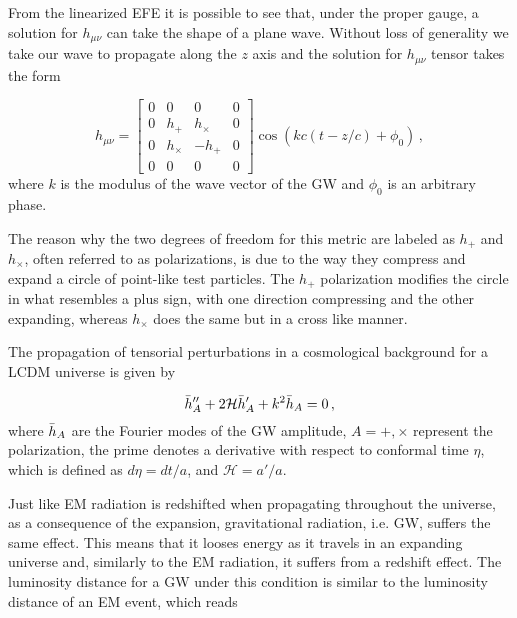 From the linearized \gls{EFE} it is possible to see that, under the proper gauge, a solution for $h_{\mu \nu}$ can take the shape of a plane wave. Without loss of generality we take our wave to propagate along the $z$ axis and the solution for $h_{\mu \nu}$ tensor takes the form

\begin{equation}
    h_{\mu \nu} =
    \begin{bmatrix}
        0 & 0        & 0        & 0 \\
        0 & h_+      & h_\times & 0 \\
        0 & h_\times & -h_+     & 0 \\
        0 & 0        & 0        & 0
    \end{bmatrix}
    \cos{\left( k c (t - z/c) + \phi_0 \right)} \,,
\end{equation}
where $k$ is the modulus of the wave vector of the \gls{GW} and $\phi_0$ is an arbitrary phase.

The reason why the two degrees of freedom for this metric are labeled as $h_+$ and $h_\times$, often referred to as polarizations, is due to the way they compress and expand a circle of point-like test particles. The $h_+$ polarization modifies the circle in what resembles a plus sign, with one direction compressing and the other expanding, whereas $h_\times$ does the same but in a cross like manner.

The propagation of tensorial perturbations in a cosmological background for a \gls{LCDM} universe is given by \cite{Maggiore2018}

\begin{equation}
    \label{eq:tensor-perturbations-LCDM}
    \Bar{h}_A'' + 2 \mathcal{H} \Bar{h}_A' + k^2 \Bar{h}_A = 0 \,,
\end{equation}
where $\Bar{h}_A$ are the Fourier modes of the \gls{GW} amplitude, $A = +, \times$ represent the polarization, the prime denotes a derivative with respect to conformal time $\eta$, which is defined as $d\eta = dt/a$, and $\mathcal{H} = a'/a$.

Just like \gls{EM} radiation is redshifted when propagating throughout the universe, as a consequence of the expansion, gravitational radiation, i.e. \gls{GW}, suffers the same effect. This means that it looses energy as it travels in an expanding universe and, similarly to the \gls{EM} radiation, it suffers from a redshift effect. The luminosity distance for a \gls{GW} under this condition is similar to the luminosity distance of an \gls{EM} event, which reads

